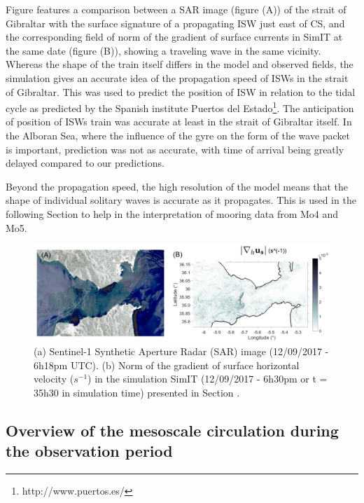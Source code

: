 Figure  features a comparison between a SAR image (figure (A)) of the strait of Gibraltar with the surface signature of a propagating ISW just east of CS, and the corresponding field of norm of the gradient of surface currents in SimIT at the same date (figure (B)), showing a traveling wave in the same vicinity. Whereas the shape of the train itself differs in the model and observed fields, the simulation gives an accurate idea of the propagation speed of ISWs in the strait of Gibraltar. This was used to predict the position of ISW in relation to the tidal cycle as predicted by the Spanish institute Puertos del Estado\footnote{http://www.puertos.es/}. The anticipation of position of ISWs train was accurate at least in the strait of Gibraltar itself. In the Alboran Sea, where the influence of the gyre on the form of the wave packet is important, prediction was not as accurate, with time of arrival being greatly delayed compared to our predictions. 

Beyond the propagation speed, the high resolution of the model means that the shape of individual solitary waves is accurate as it propagates. This is used in the following Section  to help in the interpretation of mooring data from Mo4 and Mo5.

\begin{figure}[!h]
 \includegraphics[width=\textwidth]{./GBR3D/Comp_SAR_IES.png}
 \caption[(A) Sentinel-1 SAR image. (B) Norm of the gradient of surface horizontal velocity in SimIT.] {(a) Sentinel-1 Synthetic Aperture Radar (SAR) image (12/09/2017 - 6h18pm UTC). (b) Norm of the gradient of surface horizontal velocity ($s^{-1}$) in the simulation SimIT (12/09/2017 - 6h30pm or t = 35h30 in simulation time) presented in Section .}
 \label{fig_SARIES}
\end{figure}

\subsection{Overview of the mesoscale circulation during the observation period}

